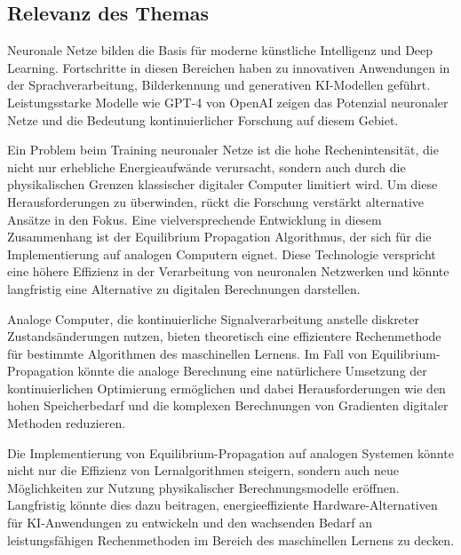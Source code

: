 \subsection{Relevanz des Themas}

Neuronale Netze bilden die Basis für moderne künstliche Intelligenz und Deep Learning. Fortschritte in diesen Bereichen haben zu innovativen Anwendungen in der Sprachverarbeitung, Bilderkennung und generativen KI-Modellen geführt. Leistungsstarke Modelle wie GPT-4 von OpenAI zeigen das Potenzial neuronaler Netze und die Bedeutung kontinuierlicher Forschung auf diesem Gebiet.

Ein Problem beim Training neuronaler Netze ist die hohe Rechenintensität, die nicht nur erhebliche Energieaufwände verursacht, sondern auch durch die physikalischen Grenzen klassischer digitaler Computer limitiert wird. Um diese Herausforderungen zu überwinden, rückt die Forschung verstärkt alternative Ansätze in den Fokus. Eine vielversprechende Entwicklung in diesem Zusammenhang ist der Equilibrium Propagation Algorithmus, der sich für die Implementierung auf analogen Computern eignet. Diese Technologie verspricht eine höhere Effizienz in der Verarbeitung von neuronalen Netzwerken und könnte langfristig eine Alternative zu digitalen Berechnungen darstellen.

Analoge Computer, die kontinuierliche Signalverarbeitung anstelle diskreter Zustandsänderungen nutzen, bieten theoretisch eine effizientere Rechenmethode für bestimmte Algorithmen des maschinellen Lernens. Im Fall von Equilibrium-Propagation könnte die analoge Berechnung eine natürlichere Umsetzung der kontinuierlichen Optimierung ermöglichen und dabei Herausforderungen wie den hohen Speicherbedarf und die komplexen Berechnungen von Gradienten digitaler Methoden reduzieren.

Die Implementierung von Equilibrium-Propagation auf analogen Systemen könnte nicht nur die Effizienz von Lernalgorithmen steigern, sondern auch neue Möglichkeiten zur Nutzung physikalischer Berechnungsmodelle eröffnen. Langfristig könnte dies dazu beitragen, energieeffiziente Hardware-Alternativen für KI-Anwendungen zu entwickeln und den wachsenden Bedarf an leistungsfähigen Rechenmethoden im Bereich des maschinellen Lernens zu decken.
